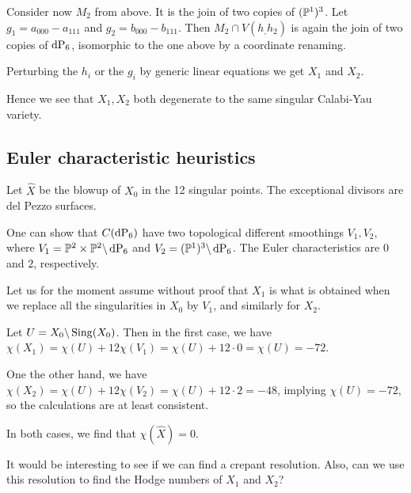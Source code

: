 \documentclass[11pt, english]{article}
\begin{document}
Consider now $M_2$ from above. It is the join of two copies of $(\mathbb{P}^1)^3$. Let $g_1=a_{000}-a_{111}$ and $g_2=b_{000}-b_{111}$. Then $M_2 \cap V(h_,h_2)$ is again the join of two copies of $\dP6$, isomorphic to the one above by a coordinate renaming.

Perturbing the $h_i$ or the $g_i$ by generic linear equations we get $X_1$ and $X_2$.

Hence we see that $X_1,X_2$ both degenerate to the same singular Calabi-Yau variety.

\subsection{Euler characteristic heuristics}

Let $\hat X$ be the blowup of $X_0$ in the 12 singular points. The exceptional divisors are del Pezzo surfaces. 

One can show that $C(\dP6)$ have two topological different smoothings $V_1,V_2$, where $V_1 = \PP^2 \times \PP^2 \bs \dP6$ and $V_2=(\PP^1)^3 \bs \dP6$. The Euler characteristics are $0$ and $2$, respectively.

Let us for the moment assume without proof that $X_1$ is what is obtained when we replace all the singularities in $X_0$ by $V_1$, and similarly for $X_2$.

Let $U = X_0 \backslash \operatorname{Sing}(X_0)$. Then in the first case, we have $\chi(X_1)=\chi(U)+12\chi(V_1)=\chi(U)+12\cdot 0 = \chi(U)=-72$. 

One the other hand, we have $\chi(X_2)=\chi(U)+12\chi(V_2)=\chi(U)+12\cdot 2 =-48$, implying $\chi(U)=-72$, so the calculations are at least consistent.

In both cases, we find that $\chi(\hat X)=0$.

It would be interesting to see if we can find a crepant resolution. Also, can we use this resolution to find the Hodge numbers of $X_1$ and $X_2$?
\end{document}

